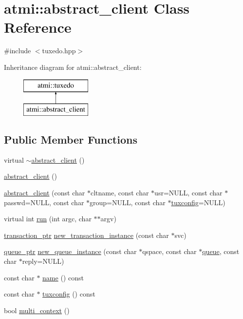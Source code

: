 \hypertarget{classatmi_1_1abstract__client}{\section{atmi\+:\+:abstract\+\_\+client Class Reference}
\label{classatmi_1_1abstract__client}
}


{\ttfamily \#include $<$tuxedo.\+hpp$>$}

Inheritance diagram for atmi\+:\+:abstract\+\_\+client\+:\begin{figure}[H]
\begin{center}
\leavevmode
\includegraphics[height=2.000000cm]{classatmi_1_1abstract__client}
\end{center}
\end{figure}
\subsection*{Public Member Functions}
\begin{DoxyCompactItemize}
\item 
virtual \hyperlink{classatmi_1_1abstract__client_a789a662f195c11cd9d9b6d091caa0874}{$\sim$abstract\+\_\+client} ()
\item 
\hyperlink{classatmi_1_1abstract__client_a10a6aa2b44cb98ceab7d4e637757437e}{abstract\+\_\+client} ()
\item 
\hyperlink{classatmi_1_1abstract__client_a67d65b7ec70b83b7fc55260256ac4fd0}{abstract\+\_\+client} (const char $\ast$cltname, const char $\ast$usr=N\+U\+L\+L, const char $\ast$passwd=N\+U\+L\+L, const char $\ast$group=N\+U\+L\+L, const char $\ast$\hyperlink{classatmi_1_1abstract__client_af2a6efcd7a45c09251cb129d04d7aa85}{tuxconfig}=N\+U\+L\+L)
\item 
virtual int \hyperlink{classatmi_1_1abstract__client_a090bac30edb1055da2a0c980167bfe19}{run} (int argc, char $\ast$$\ast$argv)
\item 
\hyperlink{group__atmi_gafc1ae4cdb2829f98c37f27b472fcb867}{transaction\+\_\+ptr} \hyperlink{classatmi_1_1abstract__client_a9449f2df2136afd5b253389418265c87}{new\+\_\+transaction\+\_\+instance} (const char $\ast$svc)
\item 
\hyperlink{group__atmi_gaf8c3e342d908ddc295b73c376b7515ca}{queue\+\_\+ptr} \hyperlink{classatmi_1_1abstract__client_a7337c966369376497d9c1f94ec12c5ae}{new\+\_\+queue\+\_\+instance} (const char $\ast$qspace, const char $\ast$\hyperlink{classatmi_1_1queue}{queue}, const char $\ast$reply=N\+U\+L\+L)
\item 
const char $\ast$ \hyperlink{classatmi_1_1abstract__client_a2f50ed746c5bab5e01ef0677296e10e3}{name} () const 
\item 
const char $\ast$ \hyperlink{classatmi_1_1abstract__client_af2a6efcd7a45c09251cb129d04d7aa85}{tuxconfig} () const 
\item 
bool \hyperlink{classatmi_1_1abstract__client_a026c8cff81a66afdcfa3bf977417738a}{multi\+\_\+context} ()
\end{DoxyCompactItemize}
